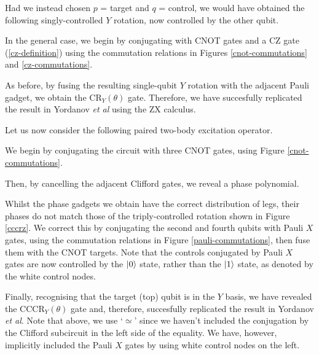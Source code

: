 
Had we instead chosen $p$ = target and $q$ = control, we would have obtained the following singly-controlled $Y$ rotation, now controlled by the other qubit.


In the general case, we begin by conjugating with CNOT gates and a CZ gate (\ref{cz-definition}) using the commutation relations in Figures \ref{cnot-commutations} and \ref{cz-commutations}.


As before, by fusing the resulting single-qubit $Y$ rotation with the adjacent Pauli gadget, we obtain the CR$_Y(\theta)$ gate. Therefore, we have succesfully replicated the result in Yordanov \textit{et al} using the ZX calculus.


Let us now consider the following paired two-body excitation operator.


We begin by conjugating the circuit with three CNOT gates, using Figure \ref{cnot-commutations}.


Then, by cancelling the adjacent Clifford gates, we reveal a phase polynomial.


Whilst the phase gadgets we obtain have the correct distribution of legs, their phases do not match those of the triply-controlled rotation shown in Figure \ref{cccrz}. We correct this by conjugating the second and fourth qubits with Pauli $X$ gates, using the commutation relations in Figure \ref{pauli-commutations}, then fuse them with the CNOT targets. Note that the controls conjugated by Pauli $X$ gates are now controlled by the $\ket 0$ state, rather than the $\ket 1$ state, as denoted by the white control nodes.


Finally, recognising that the target (top) qubit is in the $Y$ basis, we have revealed the CCCR$_Y(\theta)$ gate and, therefore, succesfully replicated the result in Yordanov \textit{et al}. Note that above, we use `$\simeq$' since we haven't included the conjugation by the Clifford subcircuit in the left side of the equality. We have, however, implicitly included the Pauli $X$ gates by using white control nodes on the left.

